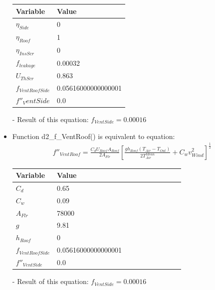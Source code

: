 \documentclass[a4paper]{article}
\begin{document}
\begin{itemize}
        \begin{table}[H]
          \centering
          \begin{tabular}{|l|l|}
            \hline
            \textbf{Variable}    & \textbf{Value}      \\ \hline
            \(\eta_{Side}\)      & 0                   \\ \hline
            \(\eta_{Roof}\)      & 1                   \\ \hline
            \(\eta_{InsScr}\)    & 0                   \\ \hline
            \(f_{leakage}\)      & 0.00032             \\ \hline
            \(U_{ThScr}\)        & 0.863               \\ \hline
            \(f_{VentRoofSide}\) & 0.05616000000000001 \\ \hline
            \(f''_VentSide\)     & 0.0                 \\ \hline
          \end{tabular}
        \end{table}

  \item[-] Result of this equation: \(f_{VentSide} = 0.00016\)

  \item Function d2\_f\_VentRoof() is equivalent to equation:
        \begin{align*}
          f''_{VentRoof} = \frac{C_d U_{Roof} A_{Roof}}{2A_{Flr}} {\left[\frac{gh_{Roof}(T_{Air} - T_{Out})}{2T^{Mean}_{Air}} + C_w v^2_{Wind}\right]}^{ \frac{1}{2}}
        \end{align*}

        \begin{table}[H]
          \centering
          \begin{tabular}{|l|l|l|l|l|l|l|l|l|l|}
            \hline
            \textbf{Variable}    & \textbf{Value}      \\ \hline
            \(C_d\)              & 0.65                \\ \hline
            \(C_w\)              & 0.09                \\ \hline
            \(A_{Flr}\)          & 78000               \\ \hline
            \(g\)                & 9.81                \\ \hline
            \(h_{Roof}\)         & 0                   \\ \hline
            \(f_{VentRoofSide}\) & 0.05616000000000001 \\ \hline
            \(f''_{VentSide}\)   & 0.0                 \\ \hline
          \end{tabular}
        \end{table}

  \item[-] Result of this equation: \(f_{VentSide} = 0.00016\)

\end{itemize}
\newpage
\end{document}
